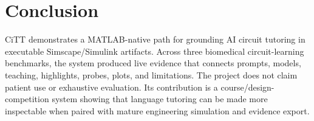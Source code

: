 \section{Conclusion}

CiTT demonstrates a MATLAB-native path for grounding AI circuit tutoring in executable Simscape/Simulink artifacts. Across three biomedical circuit-learning benchmarks, the system produced live evidence that connects prompts, models, teaching, highlights, probes, plots, and limitations. The project does not claim patient use or exhaustive evaluation. Its contribution is a course/design-competition system showing that language tutoring can be made more inspectable when paired with mature engineering simulation and evidence export.
